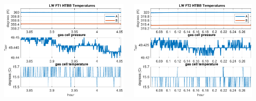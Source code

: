 \documentclass[9pt]{beamer}
\begin{document}
\begin{frame}
\begin{columns}[t]
\begin{column}{0.45\textwidth}
  \begin{centering}
  \includegraphics[width=\textwidth]{harvest_02-11/02-11_LW_FT1.pdf}
  \end{centering}
\end{column}
\begin{column}{0.45\textwidth}  
  \begin{centering}
  \includegraphics[width=\textwidth]{harvest_02-11/02-11_LW_FT2.pdf}
  \end{centering}
\end{column}
\end{columns}
\end{frame}
\end{document}
